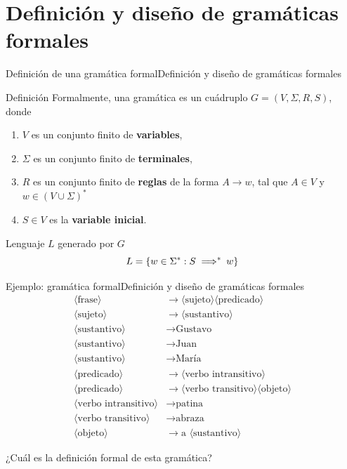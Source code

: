 \documentclass[spanish, handout]{beamer}
\begin{document}
\section{Definición y diseño de gramáticas formales}

\begin{frame}{Definición de una gramática formal}{Definición y diseño de gramáticas formales}
    
    \begin{block}{Definición}
        Formalmente, una \alert{gramática} es un cuádruplo $G = (V, \Sigma, R, S)$, donde \pause

        \begin{enumerate}
            \itemsep1.5ex
            \item $V$ es un conjunto finito de \textbf{variables}, \pause
            \item $\Sigma$ es un conjunto finito de \textbf{terminales}, \pause
            \item $R$ es un conjunto finito de \textbf{reglas} de la forma $A \to w$, tal que $A \in V$ y $w \in (V \cup \Sigma)^*$ \pause
            \item $S \in V$ es la \textbf{variable inicial}.
        \end{enumerate}
        
    \end{block}

    \begin{exampleblock}{Lenguaje $L$ generado por $G$}
        \[L = \{w \in \Sigma^* : S \implies\mkern-10mu ^{*} \enspace w\}\]
    \end{exampleblock}
\end{frame}

\begin{frame}{Ejemplo: gramática formal}{Definición y diseño de gramáticas formales}
    \begin{align*}
        \langle \text{frase} \rangle & \to \langle \text{sujeto} \rangle \langle \text{predicado} \rangle\\
        \langle \text{sujeto} \rangle & \to \langle \text{sustantivo} \rangle\\
        \langle \text{sustantivo} \rangle & \to \text{Gustavo}\\
        \langle \text{sustantivo} \rangle & \to \text{Juan}\\
        \langle \text{sustantivo} \rangle & \to \text{María}\\
        \langle \text{predicado} \rangle & \to \langle \text{verbo intransitivo} \rangle\\
        \langle \text{predicado} \rangle & \to \langle \text{verbo transitivo} \rangle \langle \text{objeto}\rangle\\
        \langle \text{verbo intransitivo} \rangle & \to \text{patina}\\
        \langle \text{verbo transitivo} \rangle & \to \text{abraza}\\
        \langle \text{objeto} \rangle & \to \text{a } \langle \text{sustantivo} \rangle
    \end{align*}

    {\large ¿Cuál es la definición formal de esta gramática?}
\end{frame}
\end{document}

